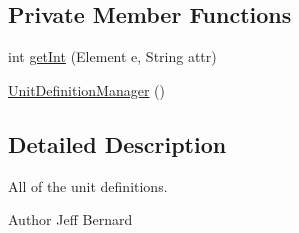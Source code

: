 \subsection*{Private Member Functions}
\begin{DoxyCompactItemize}
\item 
int \hyperlink{classrts_1_1units_1_1_unit_definition_manager_a27ca6fa520ec8c77a5940819d52ec286}{getInt} (Element e, String attr)
\item 
\hyperlink{classrts_1_1units_1_1_unit_definition_manager_a137c9ddff16dcdd8bbadb63a3a8024be}{UnitDefinitionManager} ()
\end{DoxyCompactItemize}


\subsection{Detailed Description}
All of the unit definitions. 

\begin{DoxyAuthor}{Author}
Jeff Bernard 
\end{DoxyAuthor}


